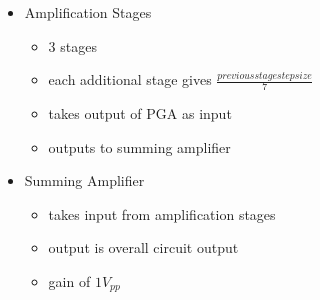 \documentclass[25pt, a0paper, portrait, margin=0mm, innermargin=15mm, blockverticalspace=15mm, colspace=15mm, subcolspace=8mm]{tikzposter}
\begin{document}
\begin{columns}
{\begin{multicols}{2}
\begin{itemize}
\item Amplification Stages
\begin{itemize}
\item 3 stages
\item each additional stage gives $\frac{previous stage step size}{7}$
\item takes output of PGA as input
\item outputs to summing amplifier
\end{itemize}

\item Summing Amplifier
\begin{itemize}
\item takes input from amplification stages
\item output is overall circuit output
\item gain of $1V_{pp}$
\end{itemize}

\end{itemize}



\end{multicols}
}


\end{columns}
\end{document}
